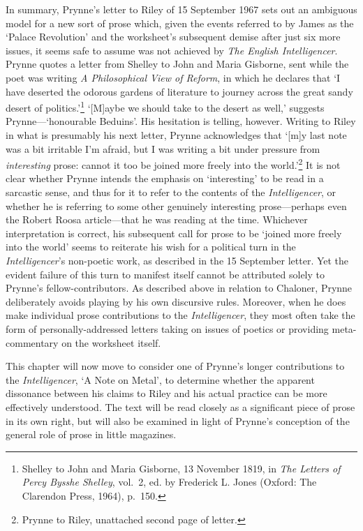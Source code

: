\documentclass[]{article}
\begin{document}
In summary, Prynne’s letter to Riley of 15 September 1967 sets out an
ambiguous model for a new sort of prose which, given the events referred
to by James as the ‘Palace Revolution’ and the worksheet’s subsequent
demise after just six more issues, it seems safe to assume was not
achieved by \emph{The English Intelligencer}. Prynne quotes a letter
from Shelley to John and Maria Gisborne, sent while the poet was writing
\emph{A Philosophical View of Reform}, in which he declares that ‘I have
deserted the odorous gardens of literature to journey across the great
sandy desert of politics.’\footnote{Shelley to John and Maria Gisborne,
  13 November 1819, in \emph{The Letters of Percy Bysshe Shelley},
  vol.~2, ed. by Frederick L. Jones (Oxford: The Clarendon Press, 1964),
  p.~150.} ‘{[}M{]}aybe we should take to the desert as well,’ suggests
Prynne—‘honourable Beduins’. His hesitation is telling, however. Writing
to Riley in what is presumably his next letter, Prynne acknowledges that
‘{[}m{]}y last note was a bit irritable I’m afraid, but I was writing a
bit under pressure from \emph{interesting} prose: cannot it too be
joined more freely into the world.’\footnote{Prynne to Riley, unattached
  second page of letter.} It is not clear whether Prynne intends the
emphasis on ‘interesting’ to be read in a sarcastic sense, and thus for
it to refer to the contents of the \emph{Intelligencer}, or whether he
is referring to some other genuinely interesting prose—perhaps even the
Robert Roosa article—that he was reading at the time. Whichever
interpretation is correct, his subsequent call for prose to be ‘joined
more freely into the world’ seems to reiterate his wish for a political
turn in the \emph{Intelligencer}’s non-poetic work, as described in the
15 September letter. Yet the evident failure of this turn to manifest
itself cannot be attributed solely to Prynne’s fellow-contributors. As
described above in relation to Chaloner, Prynne deliberately avoids
playing by his own discursive rules. Moreover, when he does make
individual prose contributions to the \emph{Intelligencer}, they most
often take the form of personally-addressed letters taking on issues of
poetics or providing meta-commentary on the worksheet itself.

This chapter will now move to consider one of Prynne’s longer
contributions to the \emph{Intelligencer}, ‘A Note on Metal’, to
determine whether the apparent dissonance between his claims to Riley
and his actual practice can be more effectively understood. The text
will be read closely as a significant piece of prose in its own right,
but will also be examined in light of Prynne’s conception of the general
role of prose in little magazines.
\end{document}
